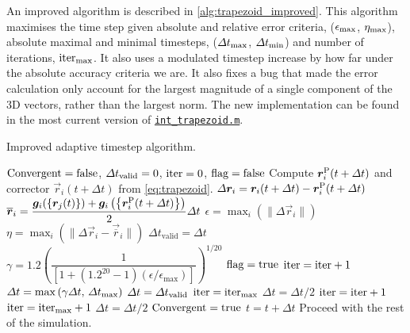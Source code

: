 An improved algorithm is described in \cref{alg:trapezoid_improved}. This algorithm maximises the time step given absolute and relative error criteria, ($\epsilon_{\textrm{max}}$, $\eta_{\textrm{max}}$), absolute maximal and minimal timesteps, ($\Delta t_{\textrm{max}}$, $\Delta t_{\textrm{min}}$) and number of iterations, $\textrm{iter}_{\textrm{max}}$. It also uses a modulated timestep increase by how far under the absolute accuracy criteria we are. It also fixes a bug that made the error calculation only account for the largest magnitude of a single component of the 3D vectors, rather than the largest norm. The new implementation can be found in the most current version of \href{https://github.com/TarletonGroup/EasyDD/blob/master/src/int_trapezoid.m}{\texttt{int\_trapezoid.m}}.
\begin{algorithm}
    \caption{Improved adaptive timestep algorithm.}
    \label{alg:trapezoid_improved}
    \begin{algorithmic}
        \State $\textrm{Convergent} = \textrm{false}$, $\Delta t_{\textrm{valid}} = 0$, $\textrm{iter} = 0$, $\textrm{flag} = \textrm{false}$
        \State Compute $\vec{r}_i^{\rvar{P}}(t + \Delta t)$ and corrector $\vec{r}_i(t + \Delta t)$ from \cref{eq:trapezoid}.
        \State $\Delta \vec{r}_i = \vec{r}_i(t + \Delta t) - \vec{r}_i^{\rvar{P}}(t + \Delta t)$
        \State $\vec{\overline{r}}_i = \dfrac{\vec{g}_i(\left\{\vec{r}_j(t)\right\}) + \vec{g}_i\left(\left\{\vec{r}_i^{\rvar{P}}(t + \Delta t)\right\}\right)}{2}\Delta t$
        \State $\epsilon = \max_i\left(\lVert \Delta \vec{r}_i \rVert \right)$
        \State $\eta = \max_i\left(\lVert \Delta \vec{r}_i - \vec{\overline{r}}_i \rVert\right)$
        \State $\Delta t_{\textrm{valid}} = \Delta t$
        \State $\gamma = 1.2\left(\dfrac{1}{\left[1 + (1.2^{20} - 1) (\epsilon / \epsilon_{\textrm{max}})\right]}\right)^{1/20}$
        \State $\textrm{flag} = \textrm{true}$
        \State $\textrm{iter} = \textrm{iter} + 1$
        \State $\Delta t = \max\left(\gamma \Delta t,\, \Delta t_{\textrm{max}}\right)$
        \State $\Delta t = \Delta t_{\textrm{valid}}$
        \State $\textrm{iter} = \textrm{iter}_{\textrm{max}}$
        \State $\Delta t = \Delta t / 2$
        \State $\textrm{iter} = \textrm{iter} + 1$
        \State $\textrm{iter} = \textrm{iter}_{\textrm{max}} + 1$
        \Else
        \State $\Delta t = \Delta t / 2$
        \EndIf
        \State $\textrm{Convergent} = \textrm{true}$
        \EndIf
        \EndWhile
        \State $t = t + \Delta t$
        \State Proceed with the rest of the simulation.
    \end{algorithmic}
\end{algorithm}

